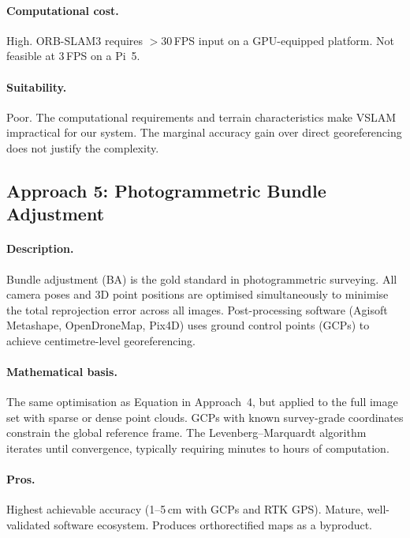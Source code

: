 \paragraph{Computational cost.}  High.  ORB-SLAM3 requires $>$30\,FPS input on a GPU-equipped platform.  Not feasible at 3\,FPS on a Pi~5.

\paragraph{Suitability.}  Poor.  The computational requirements and terrain characteristics make VSLAM impractical for our system.  The marginal accuracy gain over direct georeferencing does not justify the complexity.

\subsection{Approach 5: Photogrammetric Bundle Adjustment}\label{sec:approach-bundle}

\paragraph{Description.}
Bundle adjustment (BA) is the gold standard in photogrammetric surveying.  All camera poses and 3D point positions are optimised simultaneously to minimise the total reprojection error across all images.  Post-processing software (Agisoft Metashape, OpenDroneMap, Pix4D) uses ground control points (GCPs) to achieve centimetre-level georeferencing.

\paragraph{Mathematical basis.}
The same optimisation as Equation in Approach~4, but applied to the full image set with sparse or dense point clouds.  GCPs with known survey-grade coordinates constrain the global reference frame.  The Levenberg--Marquardt algorithm iterates until convergence, typically requiring minutes to hours of computation.

\paragraph{Pros.}
Highest achievable accuracy (1--5\,cm with GCPs and RTK GPS).  Mature, well-validated software ecosystem.  Produces orthorectified maps as a byproduct.

